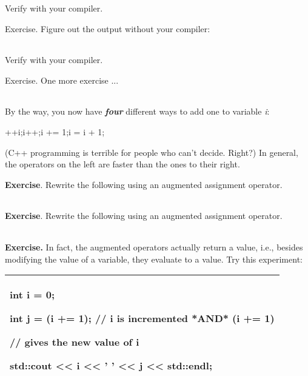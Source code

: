 \documentclass[
]{article}
\begin{document}
Verify with your compiler.

Exercise. Figure out the output without your compiler:

\begin{longtable}[]{@{}@{}}
\toprule
\endhead
\bottomrule
\end{longtable}

Verify with your compiler.

Exercise. One more exercise ...

\begin{longtable}[]{@{}@{}}
\toprule
\endhead
\bottomrule
\end{longtable}

By the way, you now have \emph{\textbf{four}} different ways to add one
to variable \emph{i}:

++i;i++;i += 1;i = i + 1;

(C++ programming is terrible for people who can't decide. Right?) In
general, the operators on the left are faster than the ones to their
right.

\textbf{Exercise}. Rewrite the following using an augmented assignment
operator.

\begin{longtable}[]{@{}@{}}
\toprule
\endhead
\bottomrule
\end{longtable}

\textbf{Exercise}. Rewrite the following using an augmented assignment
operator.

\begin{longtable}[]{@{}@{}}
\toprule
\endhead
\bottomrule
\end{longtable}

\textbf{Exercise.} In fact, the augmented operators actually return a
value, i.e., besides modifying the value of a variable, they evaluate to
a value. Try this experiment:

\begin{longtable}[]{@{}l@{}}
\toprule
\endhead
\begin{minipage}[t]{0.97\columnwidth}\raggedright
int i = 0;

int j = (i += 1); // i is incremented *AND* (i += 1)

// gives the new value of i

std::cout \textless\textless{} i \textless\textless{} ' '
\textless\textless{} j \textless\textless{} std::endl;\strut
\end{minipage}\tabularnewline
\bottomrule
\end{longtable}
\end{document}
